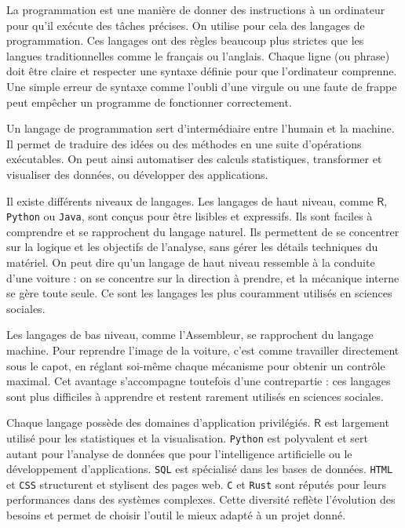\documentclass[
  letterpaper,
  DIV=11,
  numbers=noendperiod,
  oneside]{scrreprt}
\begin{document}
La programmation est une manière de donner des instructions à un
ordinateur pour qu'il exécute des tâches précises. On utilise pour cela
des langages de programmation. Ces langages ont des règles beaucoup plus
strictes que les langues traditionnelles comme le français ou l'anglais.
Chaque ligne (ou phrase) doit être claire et respecter une syntaxe
définie pour que l'ordinateur comprenne. Une simple erreur de syntaxe
comme l'oubli d'une virgule ou une faute de frappe peut empêcher un
programme de fonctionner correctement.

Un langage de programmation sert d'intermédiaire entre l'humain et la
machine. Il permet de traduire des idées ou des méthodes en une suite
d'opérations exécutables. On peut ainsi automatiser des calculs
statistiques, transformer et visualiser des données, ou développer des
applications.

Il existe différents niveaux de langages. Les langages de haut niveau,
comme \(\textsf{R}\), \texttt{Python} ou \texttt{Java}, sont conçus pour
être lisibles et expressifs. Ils sont faciles à comprendre et se
rapprochent du langage naturel. Ils permettent de se concentrer sur la
logique et les objectifs de l'analyse, sans gérer les détails techniques
du matériel. On peut dire qu'un langage de haut niveau ressemble à la
conduite d'une voiture : on se concentre sur la direction à prendre, et
la mécanique interne se gère toute seule. Ce sont les langages les plus
couramment utilisés en sciences sociales.

Les langages de bas niveau, comme l'Assembleur, se rapprochent du
langage machine. Pour reprendre l'image de la voiture, c'est comme
travailler directement sous le capot, en réglant soi-même chaque
mécanisme pour obtenir un contrôle maximal. Cet avantage s'accompagne
toutefois d'une contrepartie : ces langages sont plus difficiles à
apprendre et restent rarement utilisés en sciences sociales.

Chaque langage possède des domaines d'application privilégiés.
\(\textsf{R}\) est largement utilisé pour les statistiques et la
visualisation. \texttt{Python} est polyvalent et sert autant pour
l'analyse de données que pour l'intelligence artificielle ou le
développement d'applications. \texttt{SQL} est spécialisé dans les bases
de données. \texttt{HTML} et \texttt{CSS} structurent et stylisent des
pages web. \texttt{C} et \texttt{Rust} sont réputés pour leurs
performances dans des systèmes complexes. Cette diversité reflète
l'évolution des besoins et permet de choisir l'outil le mieux adapté à
un projet donné.
\end{document}

